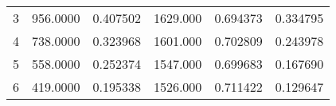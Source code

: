 \begin{tabular}{lrrrrr}
\multicolumn{1}{c}{3}&\multicolumn{1}{c}{956.0000}&\multicolumn{1}{c}{0.407502}&\multicolumn{1}{c}{1629.000}&\multicolumn{1}{c}{0.694373}&\multicolumn{1}{c}{0.334795}\\
\multicolumn{1}{c}{4}&\multicolumn{1}{c}{738.0000}&\multicolumn{1}{c}{0.323968}&\multicolumn{1}{c}{1601.000}&\multicolumn{1}{c}{0.702809}&\multicolumn{1}{c}{0.243978}\\
\multicolumn{1}{c}{5}&\multicolumn{1}{c}{558.0000}&\multicolumn{1}{c}{0.252374}&\multicolumn{1}{c}{1547.000}&\multicolumn{1}{c}{0.699683}&\multicolumn{1}{c}{0.167690}\\
\multicolumn{1}{c}{6}&\multicolumn{1}{c}{419.0000}&\multicolumn{1}{c}{0.195338}&\multicolumn{1}{c}{1526.000}&\multicolumn{1}{c}{0.711422}&\multicolumn{1}{c}{0.129647}\\
\bottomrule
\end{tabular}

